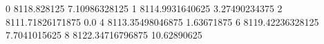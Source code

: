 0 8118.828125 7.10986328125
1 8114.9931640625 3.27490234375
2 8111.71826171875 0.0
4 8113.35498046875 1.63671875
6 8119.42236328125 7.7041015625
8 8122.34716796875 10.62890625
